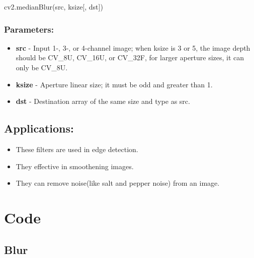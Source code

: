 \documentclass[]{article}
\newenvironment{Shaded}{}{}
\newcommand{\NormalTok}[1]{{#1}}
\providecommand{\tightlist}{%
  \setlength{\itemsep}{0pt}\setlength{\parskip}{0pt}}
\begin{document}
\begin{Shaded}
\begin{Highlighting}[]
\NormalTok{cv2.medianBlur(src, ksize[, dst])}
\end{Highlighting}
\end{Shaded}

\subsubsection{Parameters:}\label{parameters-1}

\begin{itemize}
\tightlist
\item
  \textbf{src} - Input 1-, 3-, or 4-channel image; when ksize is 3 or 5,
  the image depth should be CV\_8U, CV\_16U, or CV\_32F, for larger
  aperture sizes, it can only be CV\_8U.
\item
  \textbf{ksize} - Aperture linear size; it must be odd and greater than
  1.
\item
  \textbf{dst} - Destination array of the same size and type as src.
\end{itemize}

\subsection{Applications:}\label{applications}

\begin{itemize}
\tightlist
\item
  These filters are used in edge detection.\\
\item
  They effective in smoothening images.
\item
  They can remove noise(like salt and pepper noise) from an image.
\end{itemize}

\section{Code}\label{code}

\subsection{Blur}\label{blur-1}
\end{document}
